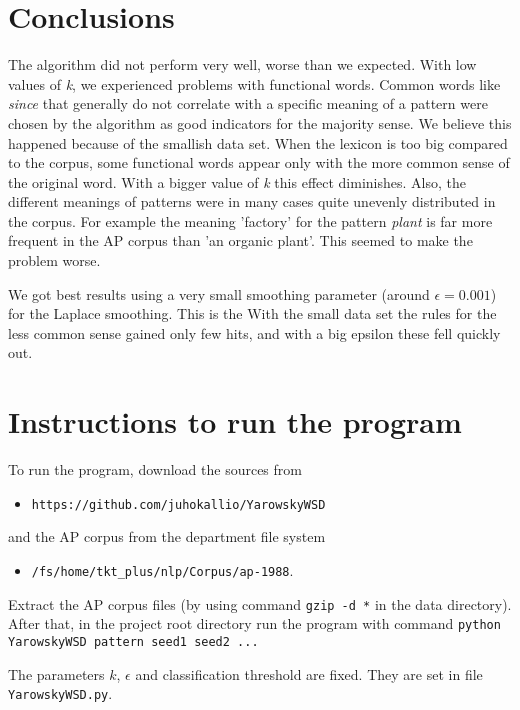 \documentclass[finnish]{article}
\begin{document}
\section{Conclusions}
The algorithm did not perform very well, worse than we expected. With low values of \emph{k}, we experienced problems with functional words. Common words like \emph{since} that generally do not correlate with a specific meaning of a pattern were chosen by the algorithm as good indicators for the majority sense. We believe this happened because of the smallish data set. When the lexicon is too big compared to the corpus, some functional words appear only with the more common sense of the original word. With a bigger value of \emph{k} this effect diminishes. Also, the different meanings of patterns were in many cases quite unevenly distributed in the corpus. For example the meaning 'factory' for the pattern \emph{plant} is far more frequent in the AP corpus than 'an organic plant'. This seemed to make the problem worse.

We got best results using a very small smoothing parameter (around $\epsilon = 0.001$) for the Laplace smoothing. This is the  With the small data set the rules for the less common sense gained only few hits, and with a big epsilon these fell quickly out.

\section{Instructions to run the program}
To run the program, download the sources from
\begin{itemize}
\item \texttt{https://github.com/juhokallio/YarowskyWSD}
\end{itemize}
\noindent and the AP corpus from the department file system
\begin{itemize}
\item \texttt{/fs/home/tkt\_plus/nlp/Corpus/ap-1988}.
\end{itemize}
Extract the AP corpus files (by using command \texttt{gzip -d *} in the data directory). After that, in the project root directory run the program with command \texttt{python YarowskyWSD pattern seed1 seed2 ...}

The parameters $k$, $\epsilon$ and classification threshold are fixed. They are set in file \texttt{YarowskyWSD.py}.
\end{document}

